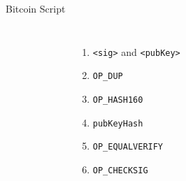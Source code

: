 \documentclass[]{beamer}
\begin{document}
\begin{frame}{Bitcoin Script}
\begin{columns}
\begin{figure}
	
\end{figure}
\begin{enumerate}
\item<1-> \texttt{<sig>} and \texttt{<pubKey>}
\item<2-> \texttt{OP\_DUP}
\item<6-> \texttt{OP\_HASH160}
\item<10-> \texttt{pubKeyHash}
\item<11-> \texttt{OP\_EQUALVERIFY}
\item<14-> \texttt{OP\_CHECKSIG}
\end{enumerate}
\end{columns}
\end{frame}
\end{document}
